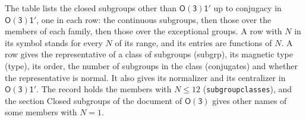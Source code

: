 \documentclass[10pt,a4paper]{article}
\numberwithin{equation}{section}
\newcommand{\grp}[1]{\mathsf{#1}}
\begin{document}
The table lists the closed subgroups other than $\grp{O(3)1'}$ up to conjugacy in $\grp{O(3)1'}$, one in each row: the continuous subgroups, then those over the members of each family, then those over the exceptional groups. \label{n:index.family.N}A row with $N$ in its symbol stands for every $N$ of its range, and its entries are functions of $N$. \label{n:head.subgroup}\label{n:head.magnetic.type}\label{n:head.order}\label{n:head.conjugates}\label{n:head.normal}A row gives the representative of a class of subgroups (subgrp), its magnetic type (type), its order, the number of subgroups in the class (conjugates) and whether the representative is normal. \label{n:head.normalizer}\label{n:head.centralizer}It also gives its normalizer and its centralizer in $\grp{O(3)1'}$. The record holds the members with $N \le 12$ (\texttt{subgroupclasses}), and the section Closed subgroups of the document of \href{../../../rotation/data/pdf/O3.pdf}{$\grp{O(3)}$} gives other names of some members with $N = 1$.
\end{document}
